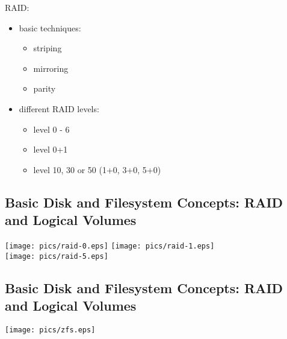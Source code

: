\documentclass[xga]{xdvislides}
\begin{document}
RAID:
\begin{itemize}
	\item basic techniques:
		\begin{itemize}
			\item striping
			\item mirroring
			\item parity
		\end{itemize}
	\item different RAID levels:
		\begin{itemize}
			\item level 0 - 6
			\item level 0+1
			\item level 10, 30 or 50 (1+0, 3+0, 5+0)
		\end{itemize}
\end{itemize}

\subsection{Basic Disk and Filesystem Concepts: RAID and Logical Volumes}
\vfill
\begin{center}
	\texttt{[image: pics/raid-0.eps]}
	\hspace{.5in}
	\texttt{[image: pics/raid-1.eps]} \\
	\vspace{.2in}
	\texttt{[image: pics/raid-5.eps]}
\end{center}
\vfill

\subsection{Basic Disk and Filesystem Concepts: RAID and Logical Volumes}
\vfill
\begin{center}
	\texttt{[image: pics/zfs.eps]} \\
\end{center}
\vfill
\end{document}

